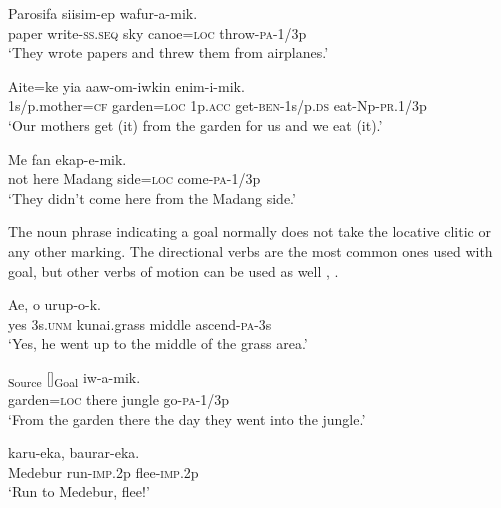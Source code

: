 \ea%
\label{ex:4:x858}
\gll Parosifa  siisim-ep     wafur-a-mik. \\
   paper  write-\textsc{ss}.\textsc{seq}  sky  canoe=\textsc{loc}  throw-\textsc{pa}-1/3p   \\
\glt`They wrote papers and threw them from airplanes.'
\z

\ea%
\label{ex:4:x859}
\gll Aite=ke    yia  aaw-om-iwkin  enim-i-mik. \\
   1s/p.mother=\textsc{cf}  garden=\textsc{loc}  1p.\textsc{acc}  get-\textsc{ben}-1s/p.\textsc{ds}  eat-Np-\textsc{pr}.1/3p   \\
\glt`Our mothers get (it) from the garden for us and we eat (it).'
\z

\ea%
\label{ex:4:x864}
\gll Me  fan     ekap-e-mik. \\
   not  here  Madang  side=\textsc{loc}  come-\textsc{pa}-1/3p   \\
\glt`They didn't come here from the Madang side.'
\z

The noun phrase indicating a goal normally does not take the locative clitic or any other marking.  The directional verbs are the most common ones used with goal, but other verbs of motion can be used as well , . 

\ea%
\label{ex:4:x860}
\gll Ae,  o     urup-o-k. \\
    yes  3s.\textsc{unm}  kunai.grass  middle  ascend-\textsc{pa}-3s  \\
\glt`Yes, he went up to the middle of the  grass area.'
\z

\ea%
\label{ex:4:x861}
\gll [Manina=pa  nan]\textsubscript{Source}  []\textsubscript{Goal}  iw-a-mik. \\
    garden=\textsc{loc}  there  jungle  go-\textsc{pa}-1/3p  \\
\glt`From the garden there the day they went into the jungle.'
\z

\ea%
\label{ex:4:x862}
\gll {}  karu-eka,  baurar-eka. \\
   Medebur  run-\textsc{imp}.2p  flee-\textsc{imp}.2p   \\
\glt`Run to Medebur, flee!'
\z


